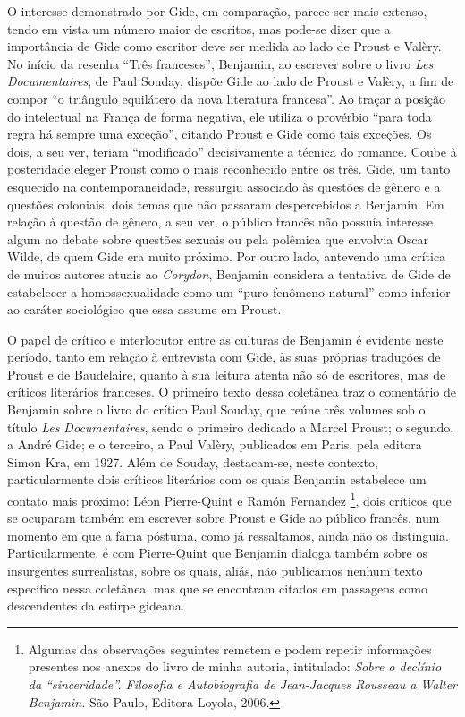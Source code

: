 O interesse demonstrado por Gide, em comparação, parece ser mais
extenso, tendo em vista um número maior de escritos, mas pode-se dizer
que a importância de Gide como escritor deve ser medida ao lado de
Proust e Valèry. No início da resenha ``Três franceses'', Benjamin, ao
escrever sobre o livro \emph{Les Documentaires}, de Paul Souday, dispõe
Gide ao lado de Proust e Valèry, a fim de compor ``o triângulo
equilátero da nova literatura francesa''. Ao traçar a posição do
intelectual na França de forma negativa, ele utiliza o provérbio ``para
toda regra há sempre uma exceção'', citando Proust e Gide como tais
exceções. Os dois, a seu ver, teriam ``modificado'' decisivamente a
técnica do romance. Coube à posteridade eleger Proust como o mais
reconhecido entre os três. Gide, um tanto esquecido na
contemporaneidade, ressurgiu associado às questões de gênero e a
questões coloniais, dois temas que não passaram despercebidos a
Benjamin. Em relação à questão de gênero, a seu ver, o público francês
não possuía interesse algum no debate sobre questões sexuais ou pela
polêmica que envolvia Oscar Wilde, de quem Gide era muito próximo. Por
outro lado, antevendo uma crítica de muitos autores atuais ao
\emph{Corydon}, Benjamin considera a tentativa de Gide de estabelecer a
homossexualidade como um ``puro fenômeno natural'' como inferior ao
caráter sociológico que essa assume em Proust.

O papel de crítico e interlocutor entre as culturas de Benjamin é
evidente neste período, tanto em relação à entrevista com Gide, às suas
próprias traduções de Proust e de Baudelaire, quanto à sua leitura
atenta não só de escritores, mas de críticos literários franceses. O
primeiro texto dessa coletânea traz o comentário de Benjamin sobre o
livro do crítico Paul Souday, que reúne três volumes sob o título
\emph{Les Documentaires}, sendo o primeiro dedicado a Marcel Proust; o
segundo, a André Gide; e o terceiro, a Paul Valèry, publicados em Paris,
pela editora Simon Kra, em 1927. Além de Souday, destacam-se, neste
contexto, particularmente dois críticos literários com os quais Benjamin
estabelece um contato mais próximo: Léon Pierre-Quint e Ramón Fernandez
\footnote{Algumas das observações seguintes remetem e podem repetir
  informações presentes nos anexos do livro de minha autoria,
  intitulado: \emph{Sobre o declínio da ``sinceridade''. Filosofia e
  Autobiografia de Jean-Jacques Rousseau a Walter Benjamin.} São Paulo,
  Editora Loyola, 2006.}, dois críticos que se ocuparam também em
escrever sobre Proust e Gide ao público francês, num momento em que a
fama póstuma, como já ressaltamos, ainda não os distinguia.
Particularmente, é com Pierre-Quint que Benjamin dialoga também sobre os
insurgentes surrealistas, sobre os quais, aliás, não publicamos nenhum
texto específico nessa coletânea, mas que se encontram citados em
passagens como descendentes da estirpe gideana.

